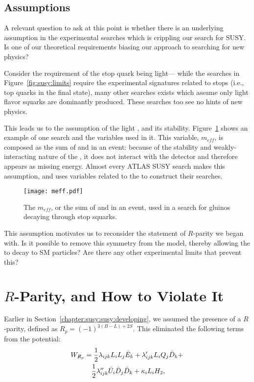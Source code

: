 \subsection{Assumptions}

A relevant question to ask at this point is whether there is an underlying assumption in the experimental searches which is crippling our search for SUSY. Is one of our theoretical requirements biasing our approach to searching for new physics?

Consider the requirement of the stop quark being light--- while the searches in Figure~\ref{fig:susy:limits} require the experimental signatures related to stops (i.e., top quarks in the final state), many other searches exists which assume only light flavor squarks are dominantly produced. These searches too see no hints of new physics.

This leads us to the assumption of the light \lsp, and its stability. Figure~\ref{fig:susy:meff} shows an example of one search and the variables used in it. This variable, $m_{eff}$, is composed as the sum of \met and \Ht in an event: because of the stability and weakly-interacting nature of the \lsp, it does not interact with the detector and therefore appears as missing energy. Almost every ATLAS SUSY search makes this assumption, and uses variables related to the \met to construct their searches. 
 


\begin{figure}
\centering
\texttt{[image: meff.pdf]}
\label{fig:susy:meff}
\caption{The $m_{eff}$, or the sum of \met and \Ht in an event, used in a search for gluinos decaying through stop squarks.}
\end{figure}


This assumption motivates us to reconsider the statement of $R$-parity we began with. Is it possible to remove this symmetry from the model, thereby allowing the \lsp to decay to SM particles? Are there any other experimental limits that prevent this? 

\section{$R$-Parity, and How to Violate It}
\label{chapter:susy:r}
Earlier in Section~\ref{chapter:susy:susy:developing}, we assumed the presence of a $R$-parity, defined as $R_p = (-1)^{3(B-L)+2S}$. This eliminated the following terms from the potential\cite{dreinerRPV}:
%
  \begin{eqnarray} 
    W_{\not R_p} &= \frac{1}{2} \lambda_{ijk} L_{i}L_{j}\bar E_{k} + \lambda_{ijk}^{\prime} L_{i}Q_{j}\bar D_{k} +  \nonumber \\
       & \quad \frac{1}{2}\lambda_{ijk}^{\prime\prime}\bar U_{i}\bar D_{j}\bar D_{k} + \kappa_iL_{i}H_{2},
    \label{eqn:rpvandudd:wrpv}
  \end{eqnarray} 


